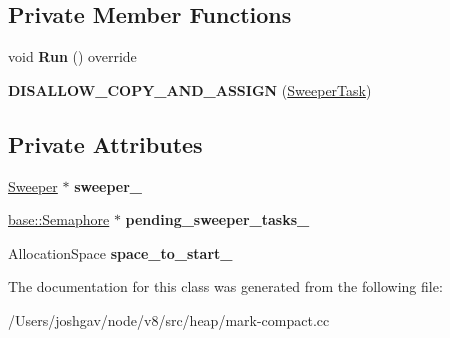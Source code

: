 \subsection*{Private Member Functions}
\begin{DoxyCompactItemize}
\item 
void {\bfseries Run} () override\hypertarget{classv8_1_1internal_1_1_mark_compact_collector_1_1_sweeper_1_1_sweeper_task_a1a40c2b8bf26b0798815f6d8527f92bf}{}\label{classv8_1_1internal_1_1_mark_compact_collector_1_1_sweeper_1_1_sweeper_task_a1a40c2b8bf26b0798815f6d8527f92bf}

\item 
{\bfseries D\+I\+S\+A\+L\+L\+O\+W\+\_\+\+C\+O\+P\+Y\+\_\+\+A\+N\+D\+\_\+\+A\+S\+S\+I\+GN} (\hyperlink{classv8_1_1internal_1_1_mark_compact_collector_1_1_sweeper_1_1_sweeper_task}{Sweeper\+Task})\hypertarget{classv8_1_1internal_1_1_mark_compact_collector_1_1_sweeper_1_1_sweeper_task_a3e4df3116657839bc59a175689be5bb8}{}\label{classv8_1_1internal_1_1_mark_compact_collector_1_1_sweeper_1_1_sweeper_task_a3e4df3116657839bc59a175689be5bb8}

\end{DoxyCompactItemize}
\subsection*{Private Attributes}
\begin{DoxyCompactItemize}
\item 
\hyperlink{classv8_1_1internal_1_1_mark_compact_collector_1_1_sweeper}{Sweeper} $\ast$ {\bfseries sweeper\+\_\+}\hypertarget{classv8_1_1internal_1_1_mark_compact_collector_1_1_sweeper_1_1_sweeper_task_a36c929b2a899eb11f94911f3ab92f81c}{}\label{classv8_1_1internal_1_1_mark_compact_collector_1_1_sweeper_1_1_sweeper_task_a36c929b2a899eb11f94911f3ab92f81c}

\item 
\hyperlink{classv8_1_1base_1_1_semaphore}{base\+::\+Semaphore} $\ast$ {\bfseries pending\+\_\+sweeper\+\_\+tasks\+\_\+}\hypertarget{classv8_1_1internal_1_1_mark_compact_collector_1_1_sweeper_1_1_sweeper_task_a62e393eb7579ae43f28c111503ce05d5}{}\label{classv8_1_1internal_1_1_mark_compact_collector_1_1_sweeper_1_1_sweeper_task_a62e393eb7579ae43f28c111503ce05d5}

\item 
Allocation\+Space {\bfseries space\+\_\+to\+\_\+start\+\_\+}\hypertarget{classv8_1_1internal_1_1_mark_compact_collector_1_1_sweeper_1_1_sweeper_task_a3c7d7af8182414bd75ecf400f5bf467b}{}\label{classv8_1_1internal_1_1_mark_compact_collector_1_1_sweeper_1_1_sweeper_task_a3c7d7af8182414bd75ecf400f5bf467b}

\end{DoxyCompactItemize}


The documentation for this class was generated from the following file\+:\begin{DoxyCompactItemize}
\item 
/\+Users/joshgav/node/v8/src/heap/mark-\/compact.\+cc\end{DoxyCompactItemize}
